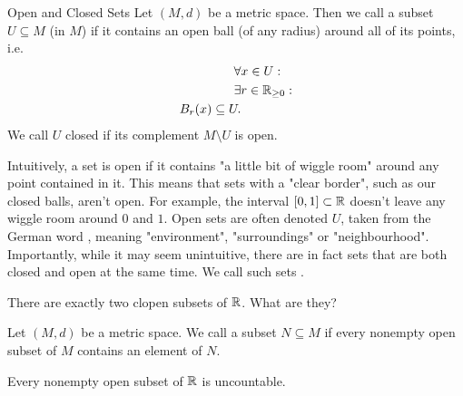 \begin{importantdefinition}{Open and Closed Sets}{}
	Let $(M,d)$ be a metric space. Then we call a subset $U \subseteq M$  (in $M$) if it contains an open ball (of any radius) around all of its points, i.e.
	\begin{align*}
		\forall &x \in U:\\
		\exists &r \in \mathbb{R}_{\geq 0}:\\
		B_r(x) \subseteq U.
	\end{align*}
	We call $U$ closed if its complement $M \setminus U$ is open.
\end{importantdefinition}
Intuitively, a set is open if it contains "a little bit of wiggle room" around any point contained in it. This means that sets with a "clear border", such as our closed balls, aren't open. For example, the interval $[0,1] \subset \mathbb{R}$ doesn't leave any wiggle room around $0$ and $1$. Open sets are often denoted $U$, taken from the German word , meaning "environment", "surroundings" or "neighbourhood".
\newpar
Importantly, while it may seem unintuitive, there are in fact sets that are both closed and open at the same time. We call such sets .
\begin{exercise}
	There are exactly two clopen subsets of $\mathbb{R}$. What are they?
\end{exercise}
\begin{definition}
	Let $(M,d)$ be a metric space. We call a subset $N \subseteq M$  if every nonempty open subset of $M$ contains an element of $N$.
\end{definition}
\begin{lemma}
	Every nonempty open subset of $\mathbb{R}$ is uncountable.
\end{lemma}
